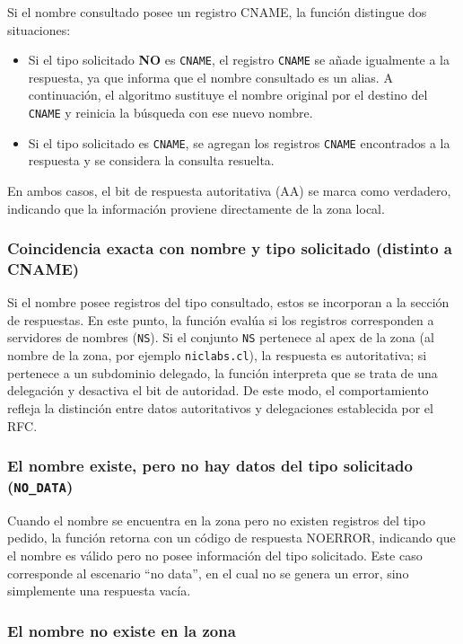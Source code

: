 Si el nombre consultado posee un registro CNAME, la función distingue dos situaciones:

\begin{itemize}
    \item Si el tipo solicitado \textbf{NO} es \texttt{CNAME}, el registro \texttt{CNAME} se añade igualmente a la respuesta, ya que informa que el nombre consultado es un alias. A continuación, 
          el algoritmo sustituye el nombre original por el destino del \texttt{CNAME} y reinicia la búsqueda con ese nuevo nombre.
    \item Si el tipo solicitado es \texttt{CNAME}, se agregan los registros \texttt{CNAME} encontrados a la respuesta y se considera la consulta resuelta. 
\end{itemize}

En ambos casos, el bit de respuesta autoritativa (AA) se marca como verdadero, indicando que la información proviene directamente de la zona local.

\subsubsection{Coincidencia exacta con nombre y tipo solicitado (distinto a CNAME)}

Si el nombre posee registros del tipo consultado, estos se incorporan a la sección de respuestas. En este punto, la función evalúa si los registros corresponden a servidores de nombres (\texttt{NS}). 
Si el conjunto \texttt{NS} pertenece al apex de la zona (al nombre de la zona, por ejemplo \texttt{niclabs.cl}), la respuesta es autoritativa; si pertenece a un subdominio delegado, la función interpreta
que se trata de una delegación y desactiva el bit de autoridad. De este modo, el comportamiento refleja la distinción entre datos autoritativos y delegaciones establecida por el RFC.

\subsubsection{El nombre existe, pero no hay datos del tipo solicitado (\texttt{NO\_DATA})}
Cuando el nombre se encuentra en la zona pero no existen registros del tipo pedido, la función retorna con un código de respuesta NOERROR, indicando que el nombre es válido 
pero no posee información del tipo solicitado. Este caso corresponde al escenario “no data”, en el cual no se genera un error, sino simplemente una respuesta vacía.

\subsubsection{El nombre no existe en la zona}

